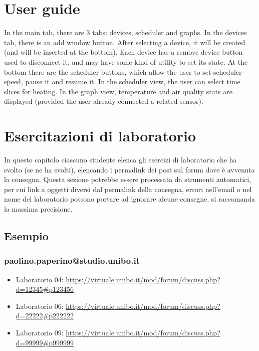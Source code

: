 \documentclass[a4paper,12pt]{report}
\begin{document}
\appendix
\chapter{User guide}

In the main tab, there are 3  tabs: devices, scheduler and graphs.
In the devices tab, there is an add window button. After selecting a device,
it will be created (and will be inserted at the bottom). Each device has a remove device button
used to disconnect it, and may have some kind of utility to set its state. \newline
At the bottom there are the scheduler buttons, which allow the user to set scheduler speed, pause it and resume it.
In the scheduler view, the user can select time slices for heating. \newline %
In the graph view, temperature and air quality stats are displayed (provided the user already connected a related sensor).

\chapter{Esercitazioni di laboratorio}

In questo capitolo ciascuno studente elenca gli esercizi di laboratorio che ha svolto
(se ne ha svolti),
elencando i permalink dei post sul forum dove è avvenuta la consegna.
%
Questa sezione potrebbe essere processata da strumenti automatici,
per cui link a oggetti diversi dal permalink della consegna,
errori nell'email o nel nome del laboratorio possono portare ad ignorare alcune consegne,
si raccomanda la massima precisione.

\section*{Esempio}

\subsection{paolino.paperino@studio.unibo.it}

\begin{itemize}
 \item Laboratorio 04: \url{https://virtuale.unibo.it/mod/forum/discuss.php?d=12345#p123456}
 \item Laboratorio 06: \url{https://virtuale.unibo.it/mod/forum/discuss.php?d=22222#p222222}
 \item Laboratorio 09: \url{https://virtuale.unibo.it/mod/forum/discuss.php?d=99999#p999999}
\end{itemize}
\end{document}
